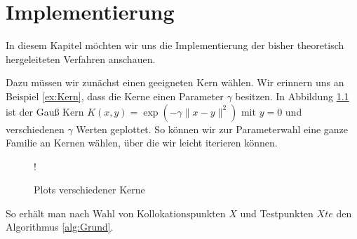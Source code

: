 \chapter{Implementierung}
\label{cha:Implementierung}

In diesem Kapitel möchten wir uns die Implementierung der bisher theoretisch hergeleiteten Verfahren anschauen.

Dazu müssen wir zunächst einen geeigneten Kern wählen. Wir erinnern uns an Beispiel \ref{ex:Kern}, dass die Kerne einen Parameter $\gamma$ besitzen. In Abbildung \ref{fig:Kerne} ist der Gauß Kern $K(x,y) = \exp\left(-\gamma \|x-y\|^2\right)$ mit $y= 0$ und verschiedenen $\gamma$ Werten geplottet. So können wir zur Parameterwahl eine ganze Familie an Kernen wählen, über die wir leicht iterieren können.
\begin{figure}[ht]
\centering
\resizebox {.8\columnwidth} {!} {

}
\caption{Plots verschiedener Kerne}
\label{fig:Kerne}
\end{figure}

So erhält man nach Wahl von Kollokationspunkten $X$ und Testpunkten $Xte$ den Algorithmus \ref{alg:Grund}.


